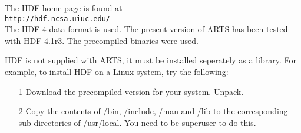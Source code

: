  The HDF home page is found at \\

 \verb|http://hdf.ncsa.uiuc.edu/| \\

 \noindent
 The HDF 4 data format is used. The present version of ARTS has been
 tested with HDF 4.1r3. The precompiled binaries were used.
 
 HDF is not supplied with ARTS, it must be installed seperately as a
 library. For example, to install HDF on a Linux system, try the
 following:
 \begin{itemize}
  \item[1] Download the precompiled version for your system. Unpack.
  \item[2] Copy the contents of /bin, /include, /man and /lib to the 
           corresponding sub-directories of /usr/local. You need to be 
           superuser to do this.  
 \end{itemize}




